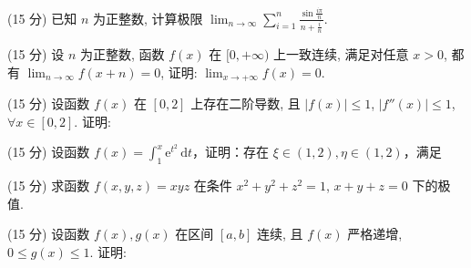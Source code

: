 \par{}
(15 分) 已知 $n$ 为正整数, 计算极限 $\lim_{n\to \infty}\sum_{i = 1}^{n}\frac{\sin\frac{i\pi}{n}}{n + \frac{i}{n}}.$\par
\par{}
(15 分) 设 $n$ 为正整数, 函数 $f(x)$ 在 $[0, +\infty)$ 上一致连续, 满足对任意 $x > 0$, 都有 $\lim_{n \to \infty} f(x + n) = 0$, 证明: $\lim_{x \to +\infty} f(x) = 0$.\par
\par{}
\par{}
(15 分) 设函数 $f(x)$ 在 $[0,2]$ 上存在二阶导数, 且 $|f(x)| \leq 1$, $|f''(x)| \leq 1$, $\forall x \in [0,2]$. 证明:\par
\nopagebreak[4]
\par{}
\par{}
(15 分) 设函数 $f(x) = \int_{1}^{x} \mathrm{e}^{t^2} \, \mathrm{d}t$，证明：存在 $\xi \in (1,2), \eta \in (1,2)$，满足\par
\nopagebreak[4]
\par{}
(15 分) 求函数 $f(x, y, z) = xyz$ 在条件 $x^2 + y^2 + z^2 = 1$, $x + y + z = 0$ 下的极值.\par
\par{}
\par{}
(15 分) 设函数 $f(x), g(x)$ 在区间 $[a, b]$ 连续, 且 $f(x)$ 严格递增, $0 \leq g(x) \leq 1$. 证明:\par
\nopagebreak[4]

